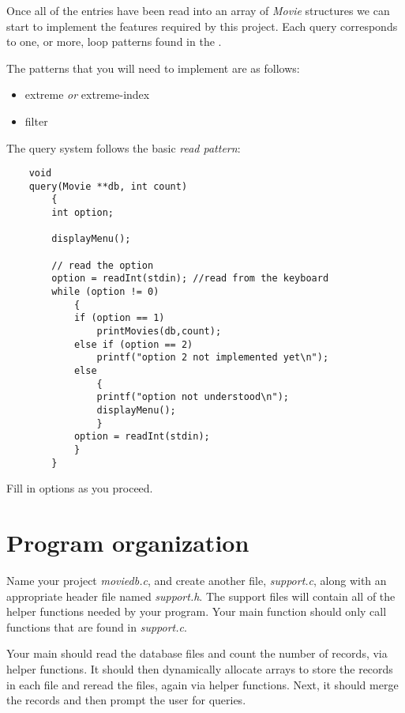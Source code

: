 \documentclass{article}
\begin{document}
Once all of the entries have been read into an array of {\it Movie} structures
we can start to implement the features required by this project.
Each query
corresponds to one, or more, loop patterns found in
the .

The patterns that you will need to implement are as follows:
\begin{itemize}
\item extreme {\it or} extreme-index
\item filter
\end{itemize}

The query system follows the basic {\it read pattern}:

\begin{verbatim}
    void
    query(Movie **db, int count)
        {
        int option;

        displayMenu();

        // read the option
        option = readInt(stdin); //read from the keyboard
        while (option != 0)
            {
            if (option == 1)
                printMovies(db,count);
            else if (option == 2)
                printf("option 2 not implemented yet\n");
            else
                {
                printf("option not understood\n");
                displayMenu();
                }
            option = readInt(stdin);
            }
        }
\end{verbatim}

Fill in options as you proceed.

\section*{Program organization}

Name your project {\it moviedb.c}, and create another file, {\it support.c},
along with an appropriate header file named {\it support.h}. 
The support files will contain all of the helper functions needed by your program.  Your
main function should only call functions that are found in {\it support.c}.

Your main should read the database files and count the number of records, via helper functions.
It should then dynamically allocate arrays to store the records in each file and reread the files,
again via helper functions.  Next, it should merge the records and then prompt the user for queries.
\end{document}
